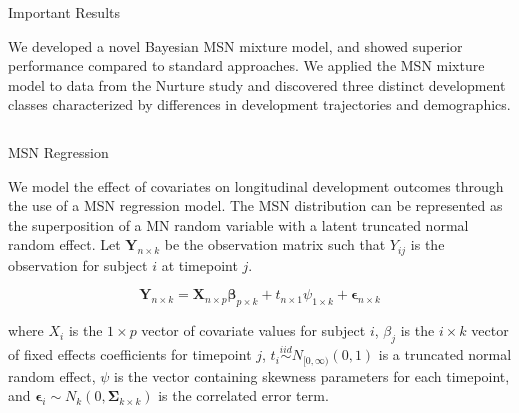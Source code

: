\documentclass[final]{beamer}
\newlength{\onecolwid}
\newlength{\twocolwid}
\begin{document}
\begin{frame}[t]
\begin{columns}[t]
\begin{column}{\twocolwid}

\begin{alertblock}{Important Results}

We developed a novel Bayesian MSN mixture model, and showed superior performance compared to standard approaches. We applied the MSN mixture model to data from the Nurture study and discovered three distinct development classes characterized by differences in development trajectories and demographics.

\end{alertblock} 


\begin{columns}[t,totalwidth=\twocolwid] %

\begin{column}{\onecolwid} %


\begin{block}{MSN Regression}

We model the effect of covariates on longitudinal development outcomes through the use of a MSN regression model. The MSN distribution can be represented as the superposition of a MN random variable with a latent truncated normal random effect. Let $\mathbf{Y}_{n \times k}$ be the observation matrix such that $Y_{ij}$ is the observation for subject $i$ at timepoint $j$.

$$\mathbf{Y}_{n \times k} = \mathbf{X}_{n \times p}\boldsymbol\beta_{p \times k} + t_{n \times 1}\psi_{1 \times k} + \boldsymbol\epsilon_{n \times k}$$

where $X_i$ is the $1 \times p$ vector of covariate values for subject $i$, $\beta_j$ is the $i \times k$ vector of fixed effects coefficients for timepoint $j$, $t_i \stackrel{iid}{\sim} N_{[0,\infty)}(0,1)$ is a truncated normal random effect, $\psi$ is the vector containing skewness parameters for each timepoint, and $\boldsymbol\epsilon_i \sim N_k(0,\boldsymbol\Sigma_{k \times k})$ is the correlated error term.


\end{block}
\end{column}
\end{columns}
\end{column}
\end{columns}
\end{frame}
\end{document}
